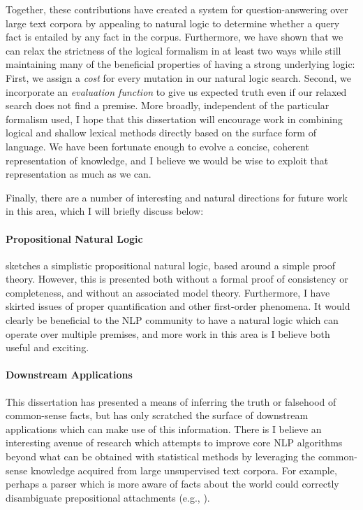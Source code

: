Together, these contributions have created a system for question-answering over large text corpora by appealing
  to natural logic to determine whether a query fact is entailed by any fact in the corpus.
Furthermore, we have shown that we can relax the strictness of the logical formalism in at least two ways
  while still maintaining many of the beneficial properties of having a strong underlying logic:
First, we assign a \textit{cost} for every mutation in our natural logic search.
Second, we incorporate an \textit{evaluation function} to give us expected truth even if our relaxed search
  does not find a premise.
More broadly, independent of the particular formalism used, I hope that this dissertation will encourage work
  in combining logical and shallow lexical methods directly based on the surface form of language.
We have been fortunate enough to evolve a concise, coherent representation of knowledge, and I believe we
  would be wise to exploit that representation as much as we can.

Finally, there are a number of interesting and natural directions for future work in this area,
  which I will briefly discuss below:

\paragraph{Propositional Natural Logic}  sketches a simplistic propositional
  natural logic, based around a simple proof theory.
However, this is presented both without a formal proof of consistency or completeness, and without an
  associated model theory.
Furthermore, I have skirted issues of proper quantification and other first-order phenomena.
It would clearly be beneficial to the NLP community to have a natural logic which can operate over
  multiple premises, and more work in this area is I believe both useful and exciting.

\paragraph{Downstream Applications} This dissertation has presented a means of inferring the truth or
  falsehood of common-sense facts, but has only scratched the surface of downstream applications which
  can make use of this information.
There is I believe an interesting avenue of research which attempts to improve core NLP algorithms
  beyond what can be obtained with statistical methods by leveraging the common-sense knowledge acquired
  from large unsupervised text corpora.
For example, perhaps a parser which is more aware of facts about the world could correctly disambiguate
  prepositional attachments (e.g., ).

